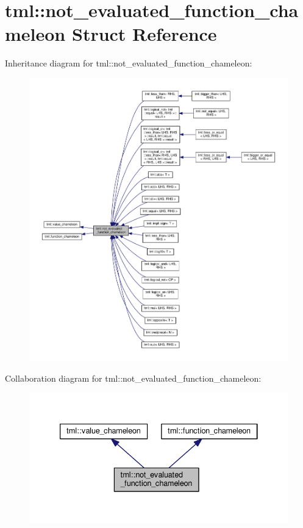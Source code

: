 \hypertarget{structtml_1_1not__evaluated__function__chameleon}{\section{tml\+:\+:not\+\_\+evaluated\+\_\+function\+\_\+chameleon Struct Reference}
\label{structtml_1_1not__evaluated__function__chameleon}
}


Inheritance diagram for tml\+:\+:not\+\_\+evaluated\+\_\+function\+\_\+chameleon\+:
\nopagebreak
\begin{figure}[H]
\begin{center}
\leavevmode
\includegraphics[width=350pt]{structtml_1_1not__evaluated__function__chameleon__inherit__graph}
\end{center}
\end{figure}


Collaboration diagram for tml\+:\+:not\+\_\+evaluated\+\_\+function\+\_\+chameleon\+:
\nopagebreak
\begin{figure}[H]
\begin{center}
\leavevmode
\includegraphics[width=333pt]{structtml_1_1not__evaluated__function__chameleon__coll__graph}
\end{center}
\end{figure}
